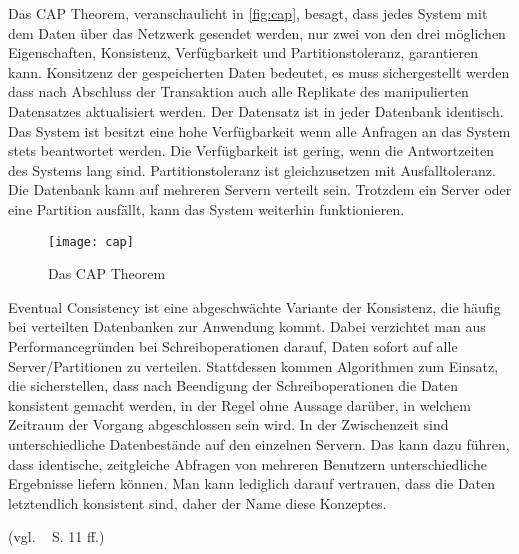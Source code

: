 Das \gls{CAP} Theorem, veranschaulicht in \autoref{fig:cap}, besagt, dass jedes System mit dem Daten über das Netzwerk gesendet werden, nur zwei von den drei möglichen Eigenschaften, Konsistenz, Verfügbarkeit und Partitionstoleranz, garantieren kann.
Konsitzenz der gespeicherten Daten bedeutet, es muss sichergestellt werden dass nach Abschluss der Transaktion auch alle Replikate des manipulierten Datensatzes aktualisiert werden. Der Datensatz ist in jeder Datenbank identisch.
Das System ist besitzt eine hohe Verfügbarkeit wenn alle Anfragen an das System stets beantwortet werden. Die Verfügbarkeit ist gering, wenn die Antwortzeiten des Systems lang sind.
Partitionstoleranz ist gleichzusetzen mit Ausfalltoleranz. Die Datenbank kann auf mehreren Servern verteilt sein. Trotzdem ein Server oder eine Partition ausfällt, kann das System weiterhin funktionieren.
\begin{figure}[H]
  \centering
  \texttt{[image: cap]}
  \grayRule
  \caption{Das CAP Theorem}
  \label{fig:cap}
\end{figure}
%
 Eventual Consistency ist eine abgeschwächte Variante der Konsistenz, die häufig bei verteilten Datenbanken zur Anwendung kommt. Dabei verzichtet man aus Performancegründen bei Schreiboperationen darauf, Daten sofort auf alle Server/Partitionen zu verteilen.
%
%
Stattdessen kommen Algorithmen zum Einsatz, die sicherstellen, dass nach Beendigung der Schreiboperationen die Daten konsistent gemacht werden, in der Regel ohne Aussage darüber, in welchem Zeitraum der Vorgang abgeschlossen sein wird. In der Zwischenzeit sind unterschiedliche Datenbestände auf den einzelnen Servern. Das kann dazu führen, dass identische, zeitgleiche Abfragen von mehreren Benutzern unterschiedliche Ergebnisse liefern können. Man kann lediglich darauf vertrauen, dass die Daten letztendlich konsistent sind, daher der Name diese Konzeptes.

(vgl. ~\cite{couchDB} S. 11 ff.)